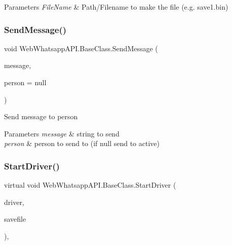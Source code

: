 \begin{DoxyParams}{Parameters}
{\em File\+Name} & Path/\+Filename to make the file (e.\+g. save1.\+bin)\\
\hline
\end{DoxyParams}
\mbox{\label{class_web_whatsapp_a_p_i_1_1_base_class_a394d26a4172531e8149b5e084917dc99}} 
\subsubsection{\texorpdfstring{Send\+Message()}{SendMessage()}}
{\footnotesize\ttfamily void Web\+Whatsapp\+A\+P\+I.\+Base\+Class.\+Send\+Message (\begin{DoxyParamCaption}\item[{string}]{message,  }\item[{string}]{person = {\ttfamily null} }\end{DoxyParamCaption})\hspace{0.3cm}{\ttfamily [inline]}}



Send message to person 


\begin{DoxyParams}{Parameters}
{\em message} & string to send\\
\hline
{\em person} & person to send to (if null send to active)\\
\hline
\end{DoxyParams}
\mbox{\label{class_web_whatsapp_a_p_i_1_1_base_class_aaa7e5947e31c9f475c95c9818f6c3a00}} 
\subsubsection{\texorpdfstring{Start\+Driver()}{StartDriver()}\hspace{0.1cm}{\footnotesize\ttfamily [1/3]}}
{\footnotesize\ttfamily virtual void Web\+Whatsapp\+A\+P\+I.\+Base\+Class.\+Start\+Driver (\begin{DoxyParamCaption}\item[{I\+Web\+Driver}]{driver,  }\item[{string}]{savefile }\end{DoxyParamCaption})\hspace{0.3cm}{\ttfamily [inline]}, {\ttfamily [virtual]}}




